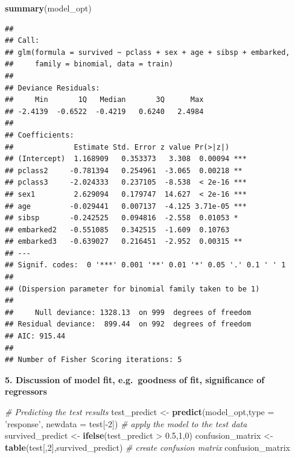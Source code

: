 \documentclass[12,]{article}
\newenvironment{Shaded}{\begin{snugshade}}{\end{snugshade}}
\newcommand{\KeywordTok}[1]{\textcolor[rgb]{0.13,0.29,0.53}{\textbf{{#1}}}}
\newcommand{\DataTypeTok}[1]{\textcolor[rgb]{0.13,0.29,0.53}{{#1}}}
\newcommand{\DecValTok}[1]{\textcolor[rgb]{0.00,0.00,0.81}{{#1}}}
\newcommand{\FloatTok}[1]{\textcolor[rgb]{0.00,0.00,0.81}{{#1}}}
\newcommand{\StringTok}[1]{\textcolor[rgb]{0.31,0.60,0.02}{{#1}}}
\newcommand{\CommentTok}[1]{\textcolor[rgb]{0.56,0.35,0.01}{\textit{{#1}}}}
\newcommand{\NormalTok}[1]{{#1}}
\begin{document}
\begin{Shaded}
\begin{Highlighting}[]
\KeywordTok{summary}\NormalTok{(model_opt)}
\end{Highlighting}
\end{Shaded}

\begin{verbatim}
## 
## Call:
## glm(formula = survived ~ pclass + sex + age + sibsp + embarked, 
##     family = binomial, data = train)
## 
## Deviance Residuals: 
##     Min       1Q   Median       3Q      Max  
## -2.4139  -0.6522  -0.4219   0.6240   2.4984  
## 
## Coefficients:
##              Estimate Std. Error z value Pr(>|z|)    
## (Intercept)  1.168909   0.353373   3.308  0.00094 ***
## pclass2     -0.781394   0.254961  -3.065  0.00218 ** 
## pclass3     -2.024333   0.237105  -8.538  < 2e-16 ***
## sex1         2.629094   0.179747  14.627  < 2e-16 ***
## age         -0.029441   0.007137  -4.125 3.71e-05 ***
## sibsp       -0.242525   0.094816  -2.558  0.01053 *  
## embarked2   -0.551085   0.342515  -1.609  0.10763    
## embarked3   -0.639027   0.216451  -2.952  0.00315 ** 
## ---
## Signif. codes:  0 '***' 0.001 '**' 0.01 '*' 0.05 '.' 0.1 ' ' 1
## 
## (Dispersion parameter for binomial family taken to be 1)
## 
##     Null deviance: 1328.13  on 999  degrees of freedom
## Residual deviance:  899.44  on 992  degrees of freedom
## AIC: 915.44
## 
## Number of Fisher Scoring iterations: 5
\end{verbatim}

\textbf{5. Discussion of model fit, e.g.~goodness of fit, significance
of regressors}

\begin{Shaded}
\begin{Highlighting}[]
  \CommentTok{# Predicting the test results}
\NormalTok{test_predict <-}\StringTok{ }\KeywordTok{predict}\NormalTok{(model_opt,}\DataTypeTok{type =} \StringTok{'response'}\NormalTok{,}
                        \DataTypeTok{newdata =} \NormalTok{test[-}\DecValTok{2}\NormalTok{]) }\CommentTok{# apply the model to the test data}
\NormalTok{survived_predict <-}\StringTok{ }\KeywordTok{ifelse}\NormalTok{(test_predict >}\StringTok{ }\FloatTok{0.5}\NormalTok{,}\DecValTok{1}\NormalTok{,}\DecValTok{0}\NormalTok{) }
\NormalTok{confusion_matrix <-}\StringTok{ }\KeywordTok{table}\NormalTok{(test[,}\DecValTok{2}\NormalTok{],survived_predict) }\CommentTok{# create confusion matrix}
\NormalTok{confusion_matrix}
\end{Highlighting}
\end{Shaded}
\end{document}
